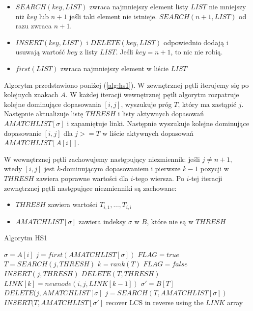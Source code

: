 \documentclass[11pt]{article}
\begin{document}
\begin{itemize}
    \item $SEARCH(key, LIST)$ zwraca najmniejszy element listy $LIST$ nie mniejszy niż $key$ lub $n+1$ jeśli taki element nie istnieje. $SEARCH(n+1, LIST)$ od razu zwraca $n+1$.
    \item $INSERT(key, LIST)$ i $DELETE(key, LIST)$ odpowiednio dodają i usuwają wartość $key$ z listy $LIST$. Jeśli $key = n+1$, to nic nie robią.
    \item $first(LIST)$ zwraca najmniejszy element w liście $LIST$
\end{itemize}

Algorytm przedstawiono poniżej (\ref{alg:hs1}). W zewnętrznej pętli iterujemy się po kolejnych znakach $A$. W każdej iteracji wewnętrznej pętli algorytm rozpatruje kolejne dominujące dopasowania $[i, j]$, wyszukuje próg $T$, który ma zastąpić $j$. Następnie aktualizuje listę $THRESH$ i listy aktywnych dopasowań $AMATCHLIST[\sigma]$ i zapamiętuje linki. Następnie wyszukuje kolejne dominujące dopasowanie $[i, j]$ dla $j >= T$ w liście aktywnych dopasowań $AMATCHLIST[A[i]]$.

W wewnętrznej pętli zachowujemy następujący niezmiennik: jeśli $j \ne n + 1$, wtedy $[i, j]$ jest $k$-dominującym dopasowaniem i pierwsze $k-1$ pozycji w $THRESH$ zawiera poprawne wartości dla $i$-tego wiersza. Po $i$-tej iteracji zewnętrznej pętli następujące niezmienniki są zachowane:

\begin{itemize}
    \item $THRESH$ zawiera wartości $T_{i, 1}, \dots, T_{i,l}$
    \item $AMATCHLIST[\sigma]$ zawiera indeksy $\sigma$ w $B$, które nie są w $THRESH$
\end{itemize}

\begin{algorithm}
\caption{Algorytm HS1}\label{alg:hs1}
\begin{algorithmic}
    \State $\sigma = A[i]$
    \State $j = first(AMATCHLIST[\sigma])$
    \State $FLAG = true$
        \State $T = SEARCH(j, THRESH)$
        \State $k = rank(T)$
            \State $FLAG = false$
        \EndIf
        \State $INSERT(j, THRESH)$
        \State $DELETE(T, THRESH)$
        \State $LINK[k]=  newnode(i, j, LINK[k-1])$
        \State $\sigma' = B[T]$
        \State $DELETE(j, AMATCHLIST[\sigma]$
        \State $j = SEARCH(T, AMATCHLIST[\sigma])$
        \State $INSERT(T, AMATCHLIST[\sigma']$
    \EndWhile
\EndFor
\State recover LCS in reverse using the $LINK$ array
\end{algorithmic}
\end{algorithm}
\end{document}
